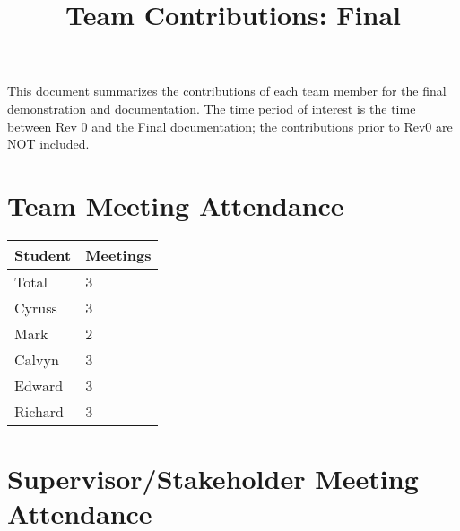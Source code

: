 \documentclass{article}
\title{Team Contributions: Final\\\progname}
\author{\authname}
\date{}
\begin{document}
\maketitle

This document summarizes the contributions of each team member for the final
demonstration and documentation.  The time period of interest is the time
between Rev 0 and the Final documentation; the contributions prior to Rev0 are
NOT included.

\section{Team Meeting Attendance}


\begin{table}[H]
\centering
\begin{tabular}{ll}
\toprule
\textbf{Student} & \textbf{Meetings}\\
\midrule
Total & 3\\
Cyruss & 3\\
Mark & 2\\
Calvyn & 3\\
Edward & 3\\
Richard & 3\\
\bottomrule
\end{tabular}
\end{table}


\section{Supervisor/Stakeholder Meeting Attendance}

\end{document}
